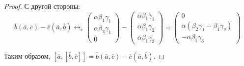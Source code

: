 \begin{proof}
	С другой стороны:
	\[\overline{b}(\overline{a}, \overline{c}) - \overline{c}(\overline{a}, \overline{b}) \leftrightarrow_{e}
	\begin{pmatrix}
		\alpha\beta_1\gamma_1\\\alpha\beta_2\gamma_1\\0
	\end{pmatrix}
	-
	\begin{pmatrix}
		\alpha\beta_1\gamma_1\\\alpha\beta_1\gamma_2\\\alpha\beta_1\gamma_3
	\end{pmatrix}
	=
	\begin{pmatrix}
		0\\\alpha(\beta_2\gamma_1 - \beta_1\gamma_2)\\-\alpha\beta_1\gamma_3
	\end{pmatrix}\]

	Таким образом, $[\overline{a}, [\overline{b}, \overline{c}]] = \overline{b}(\overline{a}, \overline{c}) - \overline{c}(\overline{a}, \overline{b})$. 
\end{proof}